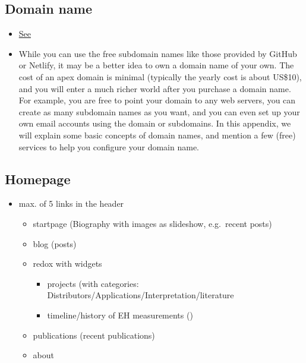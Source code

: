 \documentclass[
]{article}
\providecommand{\tightlist}{%
  \setlength{\itemsep}{0pt}\setlength{\parskip}{0pt}}
\begin{document}
\hypertarget{domain-name}{%
\subsection{Domain name}\label{domain-name}}

\begin{itemize}
\tightlist
\item
  \href{https://bookdown.org/yihui/blogdown/domain-name.html\#domain-name}{See}
\item
  While you can use the free subdomain names like those provided by
  GitHub or Netlify, it may be a better idea to own a domain name of
  your own. The cost of an apex domain is minimal (typically the
  yearly cost is about US\$10), and you will enter a much richer world
  after you purchase a domain name. For example, you are free to point
  your domain to any web servers, you can create as many subdomain
  names as you want, and you can even set up your own email accounts
  using the domain or subdomains. In this appendix, we will explain
  some basic concepts of domain names, and mention a few (free)
  services to help you configure your domain name.
\end{itemize}

\hypertarget{homepage}{%
\subsection{Homepage}\label{homepage}}

\begin{itemize}
\item
  max. of 5 links in the header

  \begin{itemize}
  \item
    startpage (Biography with images as slideshow, e.g.~recent
    posts)
  \item
    blog (posts)
  \item
    redox with widgets

    \begin{itemize}
    \tightlist
    \item
      projects (with categories:
      Distributors/Applications/Interpretation/literature
    \item
      timeline/history of EH measurements ()
    \end{itemize}
  \item
    publications (recent publications)
  \item
    about
  \end{itemize}
\end{itemize}
\end{document}
